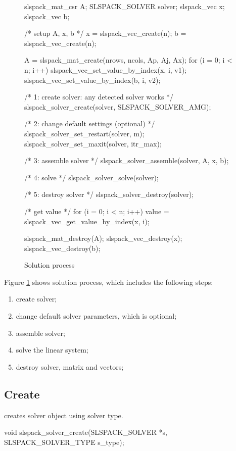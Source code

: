 \begin{figure}[!htb]
\begin{evb}
{
    slspack_mat_csr A;
    SLSPACK_SOLVER solver;
    slspack_vec x;
    slspack_vec b;

    /* setup A, x, b */
    x = slspack_vec_create(n);
    b = slspack_vec_create(n);

    A = slspack_mat_create(nrows, ncols, Ap, Aj, Ax);
    for (i = 0; i < n; i++) {
        slspack_vec_set_value_by_index(x, i, v1);
        slspack_vec_set_value_by_index(b, i, v2);
    }

    /* 1: create solver: any detected solver works */
    slspack_solver_create(solver, SLSPACK_SOLVER_AMG);

    /* 2: change default settings (optional) */
    slspack_solver_set_restart(solver, m);
    slspack_solver_set_maxit(solver, itr_max);

    /* 3: assemble solver */
    slspack_solver_assemble(solver, A, x, b);

    /* 4: solve */
    slspack_solver_solve(solver);

    /* 5: destroy solver */
    slspack_solver_destroy(solver);

    /* get value */
    for (i = 0; i < n; i++) {
        value = slspack_vec_get_value_by_index(x, i);
    }

    slspack_mat_destroy(A);
    slspack_vec_destroy(x);
    slspack_vec_destroy(b);
}
\end{evb}
    \caption{Solution process}
    \label{solution-proc}
\end{figure}

Figure \ref{solution-proc} shows solution process, which includes the following steps:
\begin{enumerate}
    \item create solver;
    \item change default solver parameters, which is optional;
    \item assemble solver;
    \item solve the linear system;
    \item destroy solver, matrix and vectors;
\end{enumerate}

\subsection{Create}
 creates solver object using solver type.
\begin{evb}
void slspack_solver_create(SLSPACK_SOLVER *s, SLSPACK_SOLVER_TYPE s_type);
\end{evb}


